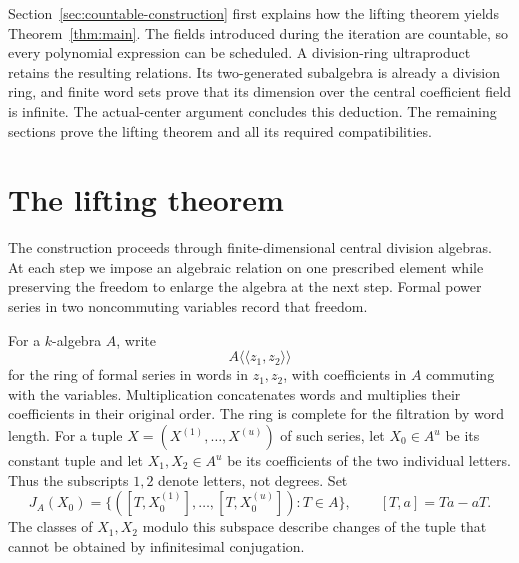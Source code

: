 \documentclass[11pt]{article}
\theoremstyle{definition}
\theoremstyle{remark}
\numberwithin{equation}{section}
\begin{document}
Section~\ref{sec:countable-construction} first explains how the lifting
theorem yields Theorem~\ref{thm:main}. The fields introduced during the
iteration are countable, so every polynomial expression can be scheduled.
A division-ring ultraproduct retains the resulting relations. Its
two-generated subalgebra is already a division ring, and finite word
sets prove that its dimension over the central coefficient field is
infinite. The actual-center argument concludes this deduction. The
remaining sections prove the lifting theorem and all its required
compatibilities.

\section{The lifting theorem}\label{sec:lifting}

The construction proceeds through finite-dimensional central division
algebras. At each step we impose an algebraic relation on one prescribed
element while preserving the freedom to enlarge the algebra at the next step.
Formal power series in two noncommuting variables record that freedom.

For a $k$-algebra $A$, write
\[
 A\langle\!\langle z_1,z_2\rangle\!\rangle
\]
for the ring of formal series in words in $z_1,z_2$, with coefficients
in $A$ commuting with the variables. Multiplication concatenates words
and multiplies their coefficients in their original order. The ring is
complete for the filtration by word length. For a tuple
$X=(X^{(1)},\ldots,X^{(u)})$ of such series, let $X_0\in A^u$ be its
constant tuple and let $X_1,X_2\in A^u$ be its coefficients of the two
individual letters. Thus the subscripts $1,2$ denote letters, not degrees.
Set
\begin{equation}\label{eq:inner-tangent}
 J_A(X_0)=\{([T,X_0^{(1)}],\ldots,[T,X_0^{(u)}]):T\in A\},
 \qquad [T,a]=Ta-aT.
\end{equation}
The classes of $X_1,X_2$ modulo this subspace describe changes of the tuple
that cannot be obtained by infinitesimal conjugation.
\end{document}
